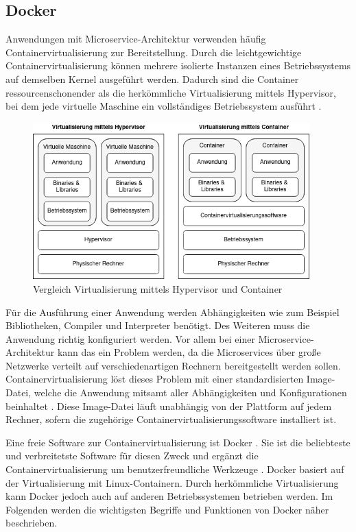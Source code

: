 \subsection{Docker}

Anwendungen mit Microservice-Architektur verwenden häufig Containervirtualisierung zur Bereitstellung. Durch die leichtgewichtige Containervirtualisierung können mehrere isolierte Instanzen eines Betriebssystems auf demselben Kernel ausgeführt werden. Dadurch sind die Container ressourcenschonender als die herkömmliche Virtualisierung mittels Hypervisor, bei dem jede virtuelle Maschine ein vollständiges Betriebssystem ausführt \parencite[vgl.][S. 166f]{newmanMicroservices2015}.

\begin{figure}[H] 
    \centering
    \includegraphics[width=0.95\textwidth]{figures/VergleichVirtualisierung.png}
    \caption{Vergleich Virtualisierung mittels Hypervisor und Container}
\end{figure}

Für die Ausführung einer Anwendung werden Abhängigkeiten wie zum Beispiel Bibliotheken, Compiler und Interpreter benötigt. Des Weiteren muss die Anwendung richtig konfiguriert werden. Vor allem bei einer Microservice-Architektur kann das ein Problem werden, da die Microservices über große Netzwerke verteilt auf verschiedenartigen Rechnern bereitgestellt werden sollen. Containervirtualisierung löst dieses Problem mit einer standardisierten Image-Datei, welche die Anwendung mitsamt aller Abhängigkeiten und Konfigurationen beinhaltet \parencite[vgl.][S. 9]{arundelCloud2019}. Diese Image-Datei läuft unabhängig von der Plattform auf jedem Rechner, sofern die zugehörige Containervirtualisierungssoftware installiert ist.

Eine freie Software zur Containervirtualisierung ist Docker \parencite[vgl.][]{dockerinc.Docker2022}. Sie ist die beliebteste und verbreitetste Software für diesen Zweck und ergänzt die Containervirtualisierung um benutzerfreundliche Werkzeuge \parencite[vgl.][S. 20]{hightowerKubernetes2018}. Docker basiert auf der Virtualisierung mit Linux-Containern. Durch herkömmliche Virtualisierung kann Docker jedoch auch auf anderen Betriebssystemen betrieben werden. Im Folgenden werden die wichtigsten Begriffe und Funktionen von Docker näher beschrieben.

